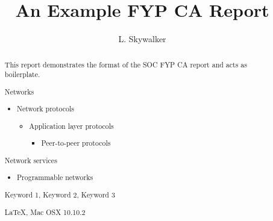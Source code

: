 \documentclass[hyp,12pt]{socreport}
\begin{document}

\title{An Example FYP CA Report}
\author{L. Skywalker}
\maketitle

\begin{abstract}
This report demonstrates the format of the SOC FYP CA report and acts as boilerplate.

\begin{descriptors}
\item Networks
    \begin{itemize}
    \item[] Network protocols
        \begin{itemize}
        \item[] Application layer protocols
            \begin{itemize}
            \item[] Peer-to-peer protocols
            \end{itemize}
        \end{itemize}
    \end{itemize}
    \item[] Network services
        \begin{itemize}
        \item[] Programmable networks
        \end{itemize}
\end{descriptors}
\begin{keywords}
    Keyword 1, Keyword 2, Keyword 3
\end{keywords}

\begin{implement}
    LaTeX, Mac OSX 10.10.2
\end{implement}


\end{abstract}

\tableofcontents







\end{document}
